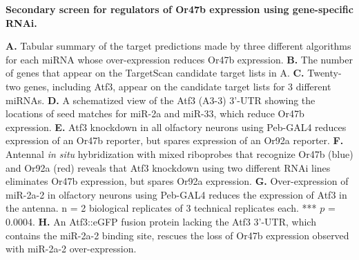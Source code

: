 {\bf Secondary screen for regulators of Or47b expression using gene-specific RNAi.}

\textbf{A.} Tabular summary of the target predictions made by three different algorithms for each miRNA whose over-expression reduces Or47b expression.
\textbf{B.} The number of genes that appear on the TargetScan candidate target lists in A.
\textbf{C.} Twenty-two genes, including Atf3, appear on the candidate target lists for 3 different miRNAs.
\textbf{D.} A schematized view of the Atf3 (A3-3) 3'-UTR showing the locations of seed matches for miR-2a and miR-33, which reduce Or47b expression.
\textbf{E.} Atf3 knockdown in all olfactory neurons using Peb-GAL4 reduces expression of an Or47b reporter, but spares expression of an Or92a reporter.
\textbf{F.} Antennal \emph{in situ} hybridization with mixed riboprobes that recognize Or47b (blue) and Or92a (red) reveals that Atf3 knockdown using two different RNAi lines eliminates Or47b expression, but spares Or92a expression.
\textbf{G.} Over-expression of miR-2a-2 in olfactory neurons using Peb-GAL4 reduces the expression of Atf3 in the antenna. n = 2 biological replicates of 3 technical replicates each. *** $p$ = 0.0004.
\textbf{H.} An Atf3::eGFP fusion protein lacking the Atf3 3'-UTR, which contains the miR-2a-2 binding site, rescues the loss of Or47b expression observed with miR-2a-2 over-expression.
\label{fig:2}